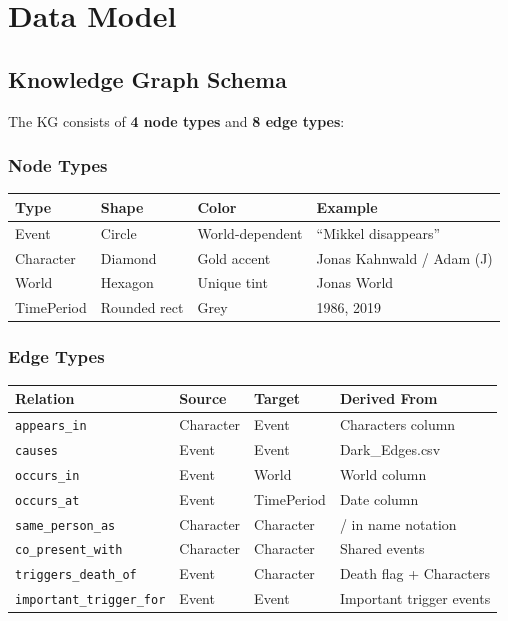 \documentclass[11pt,a4paper]{article}
\begin{document}
\section{Data Model}
\label{sec:datamodel}

\subsection{Knowledge Graph Schema}

The KG consists of \textbf{4 node types} and \textbf{8 edge types}:

\subsubsection*{Node Types}
\begin{table}[H]
\centering
\begin{tabular}{@{}llll@{}}
\toprule
\textbf{Type} & \textbf{Shape} & \textbf{Color} & \textbf{Example} \\
\midrule
Event       & Circle      & World-dependent  & ``Mikkel disappears'' \\
Character   & Diamond     & Gold accent      & Jonas Kahnwald / Adam (J) \\
World       & Hexagon     & Unique tint      & Jonas World \\
TimePeriod  & Rounded rect& Grey             & 1986, 2019 \\
\bottomrule
\end{tabular}
\end{table}

\subsubsection*{Edge Types}
\begin{table}[H]
\centering
\begin{tabular}{@{}llll@{}}
\toprule
\textbf{Relation} & \textbf{Source} & \textbf{Target} & \textbf{Derived From} \\
\midrule
\texttt{appears\_in}        & Character & Event  & Characters column \\
\texttt{causes}             & Event     & Event  & Dark\_Edges.csv \\
\texttt{occurs\_in}         & Event     & World  & World column \\
\texttt{occurs\_at}         & Event     & TimePeriod & Date column \\
\texttt{same\_person\_as}   & Character & Character & / in name notation \\
\texttt{co\_present\_with}  & Character & Character & Shared events \\
\texttt{triggers\_death\_of} & Event  & Character & Death flag + Characters \\
\texttt{important\_trigger\_for} & Event & Event & Important trigger events \\
\bottomrule
\end{tabular}
\end{table}
\end{document}
